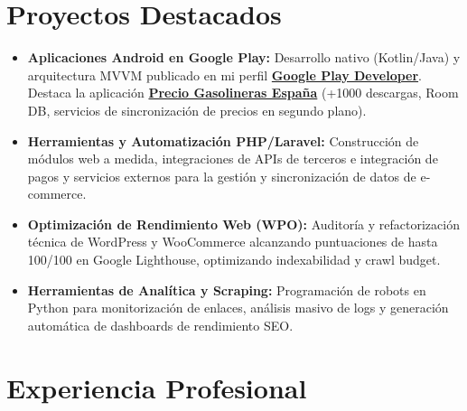 \documentclass[10pt,a4paper]{article}
\begin{document}
\section{Proyectos Destacados}
\begin{itemize}
  \item \textbf{Aplicaciones Android en Google Play:} Desarrollo nativo (Kotlin/Java) y arquitectura MVVM publicado en mi perfil \href{https://play.google.com/store/apps/dev?id=4633874941646419208}{\textbf{Google Play Developer}}. Destaca la aplicación \href{https://play.google.com/store/apps/details?id=com.walkiriaapps.topgasolineras}{\textbf{Precio Gasolineras España}} (+1000 descargas, Room DB, servicios de sincronización de precios en segundo plano).
  \item \textbf{Herramientas y Automatización PHP/Laravel:} Construcción de módulos web a medida, integraciones de APIs de terceros e integración de pagos y servicios externos para la gestión y sincronización de datos de e-commerce.
  \item \textbf{Optimización de Rendimiento Web (WPO):} Auditoría y refactorización técnica de WordPress y WooCommerce alcanzando puntuaciones de hasta 100/100 en Google Lighthouse, optimizando indexabilidad y crawl budget.
  \item \textbf{Herramientas de Analítica y Scraping:} Programación de robots en Python para monitorización de enlaces, análisis masivo de logs y generación automática de dashboards de rendimiento SEO.
\end{itemize}

\section{Experiencia Profesional}

\end{document}

